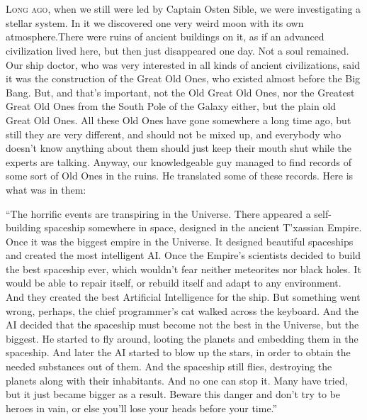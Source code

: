 \documentclass[ebook,twoside,final,openright]{memoir}
\begin{document}
\chapter{}
\par
\lettrine{L}{ong ago,} when we still were led by Captain Osten Sible, we were investigating a stellar system. In it we discovered one very weird moon with its own atmosphere.There were ruins of ancient buildings on it, as if an advanced civilization lived here, but then just disappeared one day. Not a soul remained. Our ship doctor, who was very interested in all kinds of ancient civilizations, said it was the construction of the Great Old Ones, who existed almost before the Big Bang. But, and that’s important, not the Old Great Old Ones, nor the Greatest Great Old Ones from the South Pole of the Galaxy either, but the plain old Great Old Ones. All these Old Ones have gone somewhere a long time ago, but still they are very different, and should not be mixed up, and everybody who doesn’t know anything about them should just keep their mouth shut while the experts are talking. Anyway, our knowledgeable guy managed to find records of some sort of Old Ones in the ruins. He translated some of these records. Here is what was in them:\par
\par
“The horrific events are transpiring in the Universe. There appeared a self-building spaceship somewhere in space, designed in the ancient T'xassian Empire. Once it was the biggest empire in the Universe. It designed beautiful spaceships and created the most intelligent AI. Once the Empire’s scientists decided to build the best spaceship ever, which wouldn’t fear neither meteorites nor black holes. It would be able to repair itself, or rebuild itself and adapt to any environment. And they created the best Artificial Intelligence for the ship. But something went wrong, perhaps, the chief programmer’s cat walked across the keyboard. And the AI decided that the spaceship must become not the best in the Universe, but the biggest. He started to fly around, looting the planets and embedding them in the spaceship. And later the AI started to blow up the stars, in order to obtain the needed substances out of them. And the spaceship still flies, destroying the planets along with their inhabitants. And no one can stop it. Many have tried, but it just became bigger as a result. Beware this danger and don’t try to be heroes in vain, or else you’ll lose your heads before your time.”\par
\par
\end{document}
